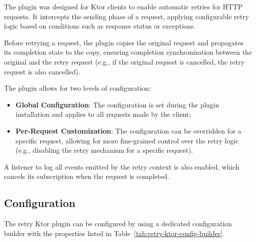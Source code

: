 The plugin was designed for Ktor clients to enable automatic retries for HTTP requests.
It intercepts the sending phase of a request,
applying configurable retry logic based on conditions such as response status or exceptions.

Before retrying a request,
the plugin copies the original request and propagates its completion state to the copy,
ensuring completion synchronization between the original and the retry request
(e.g., if the original request is cancelled, the retry request is also cancelled).

The plugin allows for two levels of configuration:

\begin{itemize}
    \item \textbf{Global Configuration}: The configuration is set during the plugin installation and applies to all requests made by the client;
    \item \textbf{Per-Request Customization}: The configuration can be overridden for a specific request, allowing for more fine-grained control over the retry logic (e.g., disabling the retry mechanism for a specific request).
\end{itemize}

A listener to log all events emitted by the retry context is also enabled,
which cancels its subscription when the request is completed.

\subsection{Configuration}\label{subsec:retry-ktor-configuration}

The retry Ktor plugin can be configured by using a dedicated configuration builder with the properties listed in
Table~\ref{tab:retry-ktor-config-builder}.

